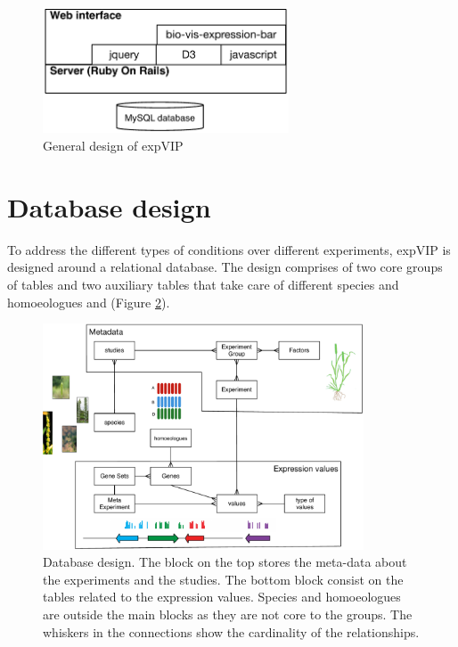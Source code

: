 \begin{figure} 
  \centering
  \includegraphics[width=0.65\textwidth]{expVIP/Figures/archDesign.pdf}
  \caption{General design of expVIP}
  \label{fig:poly:archDesign}
\end{figure}

\section{Database design} 
\label{exp:DB}

To address the different types of conditions over different experiments, expVIP is designed around a relational database. 
The design comprises of two core groups of tables and two auxiliary tables that take care of different species and  homoeologues and (Figure \ref{fig:expvip:dbDesign}).


\begin{figure}
\centering
\includegraphics[width=0.85\textwidth]{expVIP/Figures/dbDesign.pdf}
\caption[expVIP database design]{Database design. The block on the top stores the meta-data about the experiments and the studies. The bottom block consist on the tables related to the expression values. Species and homoeologues are outside the main blocks as they are not core to the groups. The whiskers in the connections show the cardinality of the relationships.  }
\label{fig:expvip:dbDesign}
\end{figure}

